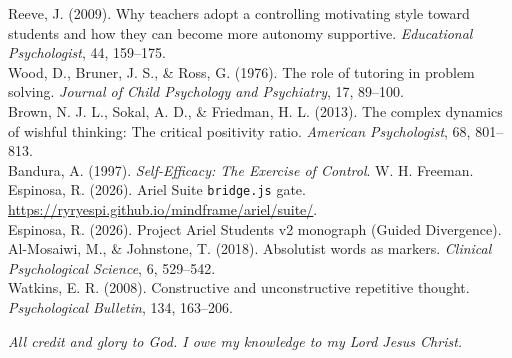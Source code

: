 \documentclass[11pt, a4paper]{article}
\begin{document}
\noindent [10] Reeve, J. (2009). Why teachers adopt a controlling motivating style toward students and how they can become more autonomy supportive. \textit{Educational Psychologist}, 44, 159--175.\\
\noindent [11] Wood, D., Bruner, J. S., \& Ross, G. (1976). The role of tutoring in problem solving. \textit{Journal of Child Psychology and Psychiatry}, 17, 89--100.\\
\noindent [12] Brown, N. J. L., Sokal, A. D., \& Friedman, H. L. (2013). The complex dynamics of wishful thinking: The critical positivity ratio. \textit{American Psychologist}, 68, 801--813.\\
\noindent [13] Bandura, A. (1997). \textit{Self-Efficacy: The Exercise of Control}. W. H. Freeman.\\
\noindent [14] Espinosa, R. (2026). Ariel Suite \texttt{bridge.js} gate. \url{https://ryryespi.github.io/mindframe/ariel/suite/}.\\
\noindent [15] Espinosa, R. (2026). Project Ariel Students v2 monograph (Guided Divergence).\\
\noindent [16] Al-Mosaiwi, M., \& Johnstone, T. (2018). Absolutist words as markers. \textit{Clinical Psychological Science}, 6, 529--542.\\
\noindent [17] Watkins, E. R. (2008). Constructive and unconstructive repetitive thought. \textit{Psychological Bulletin}, 134, 163--206.

\vspace{1.1em}
\noindent\textit{All credit and glory to God. I owe my knowledge to my Lord Jesus Christ.}
\end{document}
